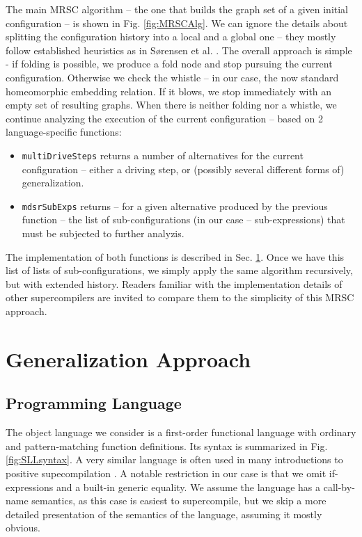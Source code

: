 \documentclass[submission,copyright,creativecommons]{eptcs}
\begin{document}
The main MRSC algorithm -- the one that builds the graph set of a given initial
configuration -- is shown in Fig. \ref{fig:MRSCAlg}.
We can ignore the details about splitting the configuration history into a local
and a global one -- they mostly follow established heuristics as in S{\o}rensen et al. 
\cite{Sorensen1994TurchinSupercompiler,sorm98b}.
The overall approach is simple - if folding is possible, we produce a fold node 
and stop pursuing the current configuration.
Otherwise we check the whistle -- in our case, the now standard homeomorphic embedding relation.
If it blows, we stop immediately with an empty set of resulting graphs.
When there is neither folding nor a whistle, we continue analyzing the execution of the
current configuration -- based on 2 language-specific functions:
\begin{itemize}
  \item \verb|multiDriveSteps| returns a number of alternatives for the current configuration --
    either a driving step, or (possibly several different forms of) generalization.
  \item \verb|mdsrSubExps| returns -- for a given alternative produced by the previous function --
    the list of sub-configurations (in our case -- sub-expressions) that must be subjected
    to further analyzis.
\end{itemize}
The implementation of both functions is described in Sec. \ref{sec:Generalize}.
Once we have this list of lists of sub-configurations, we simply apply the same
algorithm recursively, but with extended history.
Readers familiar with the implementation details of other supercompilers are
invited to compare them to the simplicity of this MRSC approach.

\section{Generalization Approach}\label{sec:Generalize}

\subsection{Programming Language}

The object language we consider is a first-order functional language with ordinary and 
pattern-matching function definitions.
Its syntax is summarized in Fig. \ref{fig:SLLsyntax}.
A very similar language is often used in many introductions to positive
supecompilation \cite{Sorensen1994TurchinSupercompiler,sorm98b,TMR/SCP2014}.
A notable restriction in our case is that we omit if-expressions and a built-in generic equality.
We assume the language has a call-by-name semantics, as this case is easiest to supercompile,
but we skip a more detailed presentation of the semantics of the language, assuming it mostly obvious.
\end{document}
